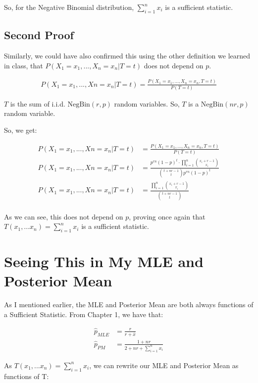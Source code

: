 \documentclass[
  letterpaper,
  DIV=11,
  numbers=noendperiod]{scrreprt}
\begin{document}
So, for the Negative Binomial distribution, \(\sum_{i=1}^n x_i\) is a
sufficient statistic.

\subsection{Second Proof}\label{second-proof}

Similarly, we could have also confirmed this using the other definition
we learned in class, that \(P(X_1=x_1,...,X_n=x_n | T = t)\) does not
depend on \(p\).

\[
\begin{aligned}
P(X_1=x_1,...,Xn=x_n | T=t) = \frac{P(X_1=x_1,...,X_n=x_n, T=t)}{P(T=t)} 
\end{aligned}
\]

\(T\) is the sum of i.i.d. \(\text{NegBin}(r, p)\) random variables. So,
\(T\) is a \(\text{NegBin}(nr, p)\) random variable.

So, we get:

\[
\begin{aligned}
P(X_1=x_1,...,Xn=x_n | T=t) &= \frac{P(X_1=x_1,...,X_n=x_n, T=t)}{P(T=t)} \\
P(X_1=x_1,...,Xn=x_n | T=t) &= \frac{p^{rn}(1 - p)^{t} \cdot  \prod_{i=1}^n \binom{x_i + r - 1}{x_i}}{\binom{t + nr- 1}{t} p^{rn} (1 - p)^{t}} \\
P(X_1=x_1,...,Xn=x_n | T=t) &= \frac{  \prod_{i=1}^n \binom{x_i + r - 1}{x_i}}{\binom{t + nr - 1}{t} } \\
\end{aligned}
\]

As we can see, this does not depend on \(p\), proving once again that
\(T(x_1,...x_n) = \sum_{i=1}^n x_i\) is a sufficient statistic.

\section{Seeing This in My MLE and Posterior
Mean}\label{seeing-this-in-my-mle-and-posterior-mean}

As I mentioned earlier, the MLE and Posterior Mean are both always
functions of a Sufficient Statistic. From Chapter 1, we have that:

\[
\begin{aligned}
\hat{p}_{MLE} &= \frac{r}{r + \bar{x}} \\
\hat{p}_{PM} &= \frac{1 + nr}{2 + nr + \sum_{i=1}^n x_i}
\end{aligned}
\]

As \(T(x_1,...x_n) = \sum_{i=1}^n x_i\), we can rewrite our MLE and
Posterior Mean as functions of T:
\end{document}
